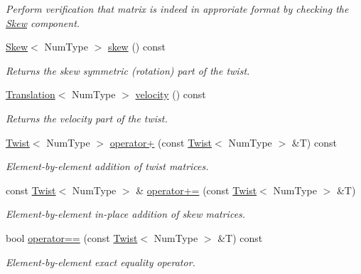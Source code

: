\begin{DoxyCompactItemize}
\begin{DoxyCompactList}\small\item\em Perform verification that matrix is indeed in approriate format by checking the \hyperlink{singletonscrews_1_1_skew}{Skew} component. \end{DoxyCompactList}\item 
\hyperlink{singletonscrews_1_1_skew}{Skew}$<$ Num\+Type $>$ \hyperlink{singletonscrews_1_1_twist_aef12b31f543a87beb9a0b30b0e33cf4f}{skew} () const 
\begin{DoxyCompactList}\small\item\em Returns the skew symmetric (rotation) part of the twist. \end{DoxyCompactList}\item 
\hyperlink{singletonscrews_1_1_translation}{Translation}$<$ Num\+Type $>$ \hyperlink{singletonscrews_1_1_twist_aff8bab103ef45feabb606b45b489406f}{velocity} () const 
\begin{DoxyCompactList}\small\item\em Returns the velocity part of the twist. \end{DoxyCompactList}\item 
\hyperlink{singletonscrews_1_1_twist}{Twist}$<$ Num\+Type $>$ \hyperlink{singletonscrews_1_1_twist_a18135225dcc8dd0a684cc3e13c603632}{operator+} (const \hyperlink{singletonscrews_1_1_twist}{Twist}$<$ Num\+Type $>$ \&T) const 
\begin{DoxyCompactList}\small\item\em Element-\/by-\/element addition of twist matrices. \end{DoxyCompactList}\item 
const \hyperlink{singletonscrews_1_1_twist}{Twist}$<$ Num\+Type $>$ \& \hyperlink{singletonscrews_1_1_twist_a69a02d5931b08a33b3f9403c14e9b875}{operator+=} (const \hyperlink{singletonscrews_1_1_twist}{Twist}$<$ Num\+Type $>$ \&T)
\begin{DoxyCompactList}\small\item\em Element-\/by-\/element in-\/place addition of skew matrices. \end{DoxyCompactList}\item 
bool \hyperlink{singletonscrews_1_1_twist_a0294f006eef3e1bf81873b6b23a726d2}{operator==} (const \hyperlink{singletonscrews_1_1_twist}{Twist}$<$ Num\+Type $>$ \&T) const 
\begin{DoxyCompactList}\small\item\em Element-\/by-\/element exact equality operator. \end{DoxyCompactList}\item 

\end{DoxyCompactItemize}
